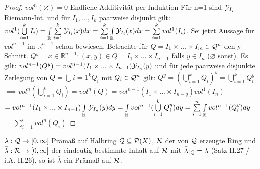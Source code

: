   \begin{proof}
    $vol^n(\varnothing) = 0$ \newline
    Endliche Additivität per Induktion \newline
    Für n=1 sind $\mathcal{Y}_{I_j}$ Riemann-Int. und für $I_1, ..., I_k$ paarweise disjunkt gilt: \newline
    $vol^1(\bigcup\limits_{i=1}^{k}I_i) = \int\limits_{\mathbb{R}}\sum\limits_{i=1}^{k}\mathcal{Y}_{I_i}(x) dx = \sum\limits_{i=1}^{k}\int\limits_{\mathbb{R}}\mathcal{Y}_{I_i}(x) dx = \sum\limits_{i=1}^{k}vol^1(I_i)$. \newline
    Sei jetzt Aussage für $vol^{n-1}$ im $\mathbb{R}^{n-1}$ schon bewiesen. Betrachte für $Q = I_1\times ... \times I_m \in \mathcal{Q}^n$ den y-Schnitt. \newline
    $Q^y = {x\in\mathbb{R}^{n-1}: (x,y) \in Q} = I_1\times ... \times I_{n-1}$ falls $y\in I_n$ ($\varnothing$ sonst). \newline
Es gilt: $vol^{n-1}(Q^y) = vol^{n-1}(I_1\times ...\times I_{n-1})\mathcal{Y}_{I_n}(y)$ und für jede paarweise disjunkte Zerlegung von $Q = \bigcup\limits{i=1}^{k}Q_i$ mit $Q_i\in\mathcal{Q}^n$ gilt: \newline 
$Q^y = (\bigcup\limits_{i=1}^{k}Q_i)^y = \bigcup\limits_{i=1}^{k}Q_i^y$ \newline
$\implies vol^n(\bigcup\limits_{i=1}^{k}Q_i) = vol^n(Q) = vol^{n-1}(I_1\times ... \times I_{n-q})vol^1(I_n)$ \newline
$ = vol^{n-1}(I_1\times ... \times I_{n-1})\int\limits_{\mathbb{R}}\mathcal{Y}_{I_n}(y) dy = \int\limits_{\mathbb{R}} vol^{n-1}(\bigcup\limits_{i=1}^{k}Q_i^y) dy = \sum\limits_{i=1}^{n}\int\limits_{\mathbb{R}}vol^{n-1}(Q_i^y)dy$ \newline
$= \sum\limits_{i=1}^{l} vol^n(Q_i)$
  \end{proof}

  \begin{theorem}[i.A. II.29]
    $\lambda: \mathcal{Q} \to [0, \infty]$ Prämaß auf Halbring $\mathcal{Q} \subseteq \mathcal{P}(X)$, $\mathcal{R}$ der von $\mathcal{Q}$ erzeugte Ring und $\bar{\lambda}: \mathcal{R} \to [0,\infty]$ der eindeutig bestimmte Inhalt auf $\mathcal{R}$ mit $\bar{\lambda}|_{\mathcal{Q}}=\lambda$ (Satz II.27 / i.A. II.26), so ist $\bar{\lambda}$ ein Prämaß auf $\mathcal{R}$.
  \end{theorem}

